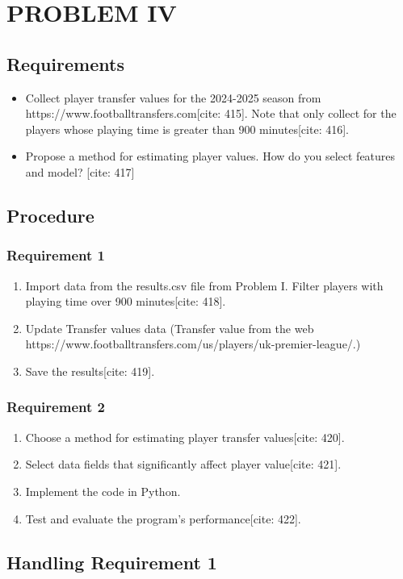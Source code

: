 \documentclass[12pt]{report}
\begin{document}
{{\chapter{PROBLEM IV}
{
\section{Requirements}
\begin{itemize}
    \item Collect player transfer values for the 2024-2025 season from https://www.footballtransfers.com[cite: 415]. Note that only collect for the players whose playing time is greater than 900 minutes[cite: 416].
    \item Propose a method for estimating player values. How do you select features and model? [cite: 417]
\end{itemize}
\section{Procedure}
\subsection{Requirement 1}
\begin{enumerate}
    \item Import data from the results.csv file from Problem I. Filter players with playing time over 900 minutes[cite: 418].
    \item Update Transfer values data (Transfer value from the web https://www.footballtransfers.com/us/players/uk-premier-league/.)
    \item Save the results[cite: 419].
\end{enumerate}
\subsection{Requirement 2}
\begin{enumerate}
    \item Choose a method for estimating player transfer values[cite: 420].
    \item Select data fields that significantly affect player value[cite: 421].
    \item Implement the code in Python.
    \item Test and evaluate the program's performance[cite: 422].
\end{enumerate}
\section{Handling Requirement 1}
}}}
\end{document}

